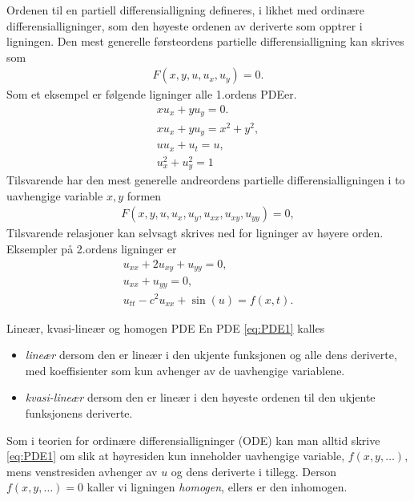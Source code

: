 Ordenen til en partiell differensialligning defineres, i likhet med ordinære differensialligninger, som den høyeste ordenen av deriverte som opptrer i ligningen. Den mest generelle førsteordens partielle differensialligning kan skrives som
\begin{align}\label{eq:fo_PDE}
F(x, y, u, u_x, u_y) = 0. 
\end{align}
Som et eksempel er følgende ligninger alle 1.ordens PDEer.
\begin{equation}\label{eq:ex_fo_PDEs} \begin{aligned}
x u_x + y u_y = 0.\\
x u_x + y u_y = x^2 + y^2, \\
u u_x + u_t = u, \\
u_x^2 + u_y^2 = 1 \end{aligned}
\end{equation}
Tilsvarende har den mest generelle andreordens partielle differensialligningen i to uavhengige variable \( x, y \) formen
\begin{align}\label{eq:so_PDE}
F(x, y, u, u_x, u_y, u_{xx}, u_{xy}, u_{yy}) = 0,
\end{align}
Tilsvarende relasjoner kan selvsagt skrives ned for ligninger av høyere orden. Eksempler på 2.ordens ligninger er
\begin{equation}\label{eq:ex_so_PDEs}
\begin{aligned}u_{xx} + 2u_{xy} + u_{yy} = 0,\\
u_{xx} + u_{yy} = 0, \\
u_{tt} - c^2 u_{xx} + \sin(u)= f(x, t).\end{aligned}
\end{equation}


\begin{defn}{Lineær, kvasi-lineær og homogen PDE}
En PDE \eqref{eq:PDE1} kalles 
\begin{itemize}
\item \emph{lineær} dersom den er lineær i den ukjente funksjonen og alle dens deriverte, med koeffisienter som kun avhenger av de uavhengige variablene.
\item \emph{kvasi-lineær} dersom den er lineær i den høyeste ordenen til den ukjente funksjonens deriverte.
\end{itemize}
Som i teorien for ordinære differensialligninger (ODE) kan man alltid skrive \eqref{eq:PDE1} om slik at høyresiden kun inneholder uavhengige variable, $f(x,y,\ldots)$, mens venstresiden avhenger av $u$ og dens deriverte i tillegg. Derson $f(x,y,\ldots)=0$ kaller vi ligningen \emph{homogen}, ellers er den inhomogen.
\end{defn}


